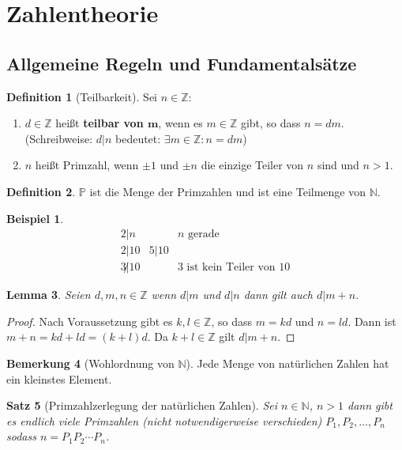 \documentclass{article}
\theoremstyle{definition}
\newtheorem{definition}{Definition}[section]
\newtheorem{bem}[definition]{Bemerkung}
\newtheorem*{bei*}{Beispiel}
\theoremstyle{plain}
\newtheorem{sa}[definition]{Satz}
\newtheorem{lem}[definition]{Lemma}
\begin{document}
\section{Zahlentheorie}
\subsection{Allgemeine Regeln und Fundamentalsätze}
\begin{definition}[Teilbarkeit]
	Sei $ n \in \mathbb{Z} $:
	\begin{enumerate}
		\item $ d \in \mathbb{Z} $ heißt \textbf{teilbar von $ \mathbf{m} $}, wenn es $ m \in \mathbb{Z} $ gibt, so dass $ n = dm $. (Schreibweise: $ d|n $ bedeutet: $ \exists m \in \mathbb{Z}: n=dm $)
		\item 
		$ n $ heißt Primzahl, wenn $ \pm 1 $ und $ \pm n $ die einzige Teiler von $ n $ sind und $ n > 1 $.
	\end{enumerate}
\end{definition}
\begin{definition}
	$ \mathbb{P} $ ist die Menge der Primzahlen und ist eine Teilmenge von $ \mathbb{N} $.
\end{definition}
\begin{bei*}
	\[ 
	\begin{array}{lll}
		2|n & & n \,\, \text{gerade} \\
		2|10 & 5|10 & \\
		3 \not| 10 & & 3 \,\, \text{ist kein Teiler von} \,\, 10	
	\end{array}
	 \]
\end{bei*}
\begin{lem}
	Seien $ d,m,n \in \mathbb{Z} $ wenn $ d|m $ und $ d|n $ dann gilt auch $ d|m+n $.
\end{lem}
\begin{proof}
	Nach Voraussetzung gibt es $ k,l \in \mathbb{Z} $, so dass $ m = kd $ und $ n = ld $. Dann ist 
	$ m+n = kd + ld = (k+l)d $. Da $ k+l \in \mathbb{Z} $ gilt $ d|m+n $.
\end{proof}
\begin{bem}[Wohlordnung von $ \mathbb{N} $] \label{12}
	Jede Menge von natürlichen Zahlen hat ein kleinstes Element.
\end{bem}
\begin{sa}[Primzahlzerlegung der natürlichen Zahlen]\label{21}
	Sei $ n \in \mathbb{N} $, $ n>1 $ dann gibt es endlich viele Primzahlen (nicht notwendigerweise verschieden) $ P_1 , P_2 , \ldots , P_n $ sodass $ n = P_1 P_2 \cdots P_n $.
\end{sa}
\end{document}
